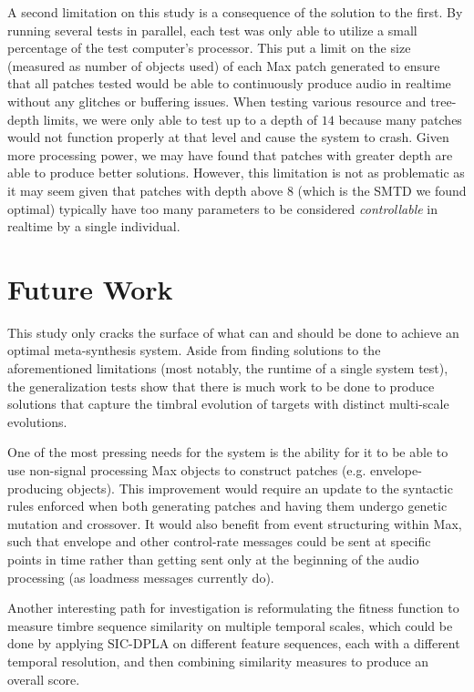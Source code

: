 \documentclass[a4paper,12pt]{report} 	%
\numberwithin{figure}{chapter}
\numberwithin{table}{chapter}
\numberwithin{equation}{chapter}
\begin{document}
\begin{flushleft}
A second limitation on this study is a consequence of the solution to the first. By running several tests in parallel, each test was only able to utilize a small percentage of the test computer's processor. This put a limit on the size (measured as number of objects used) of each Max patch generated to ensure that all patches tested would be able to continuously produce audio in realtime without any glitches or buffering issues. When testing various resource and tree-depth limits, we were only able to test up to a depth of $14$ because many patches would not function properly at that level and cause the system to crash. Given more processing power, we may have found that patches with greater depth are able to produce better solutions. However, this limitation is not as problematic as it may seem given that patches with depth above $8$ (which is the SMTD we found optimal) typically have too many parameters to be considered \emph{controllable} in realtime by a single individual.

\section{Future Work}
This study only cracks the surface of what can and should be done to achieve an optimal meta-synthesis system. Aside from finding solutions to the aforementioned limitations (most notably, the runtime of a single system test), the generalization tests show that there is much work to be done to produce solutions that capture the timbral evolution of targets with distinct multi-scale evolutions.

One of the most pressing needs for the system is the ability for it to be able to use non-signal processing Max objects to construct patches (e.g. envelope-producing objects). This improvement would require an update to the syntactic rules enforced when both generating patches and having them undergo genetic mutation and crossover. It would also benefit from event structuring within Max, such that envelope and other control-rate messages could be sent at specific points in time rather than getting sent only at the beginning of the audio processing (as loadmess messages currently do).

Another interesting path for investigation is reformulating the fitness function to measure timbre sequence similarity on multiple temporal scales, which could be done by applying SIC-DPLA on different feature sequences, each with a different temporal resolution, and then combining similarity measures to produce an overall score.


\end{flushleft}
\end{document}
